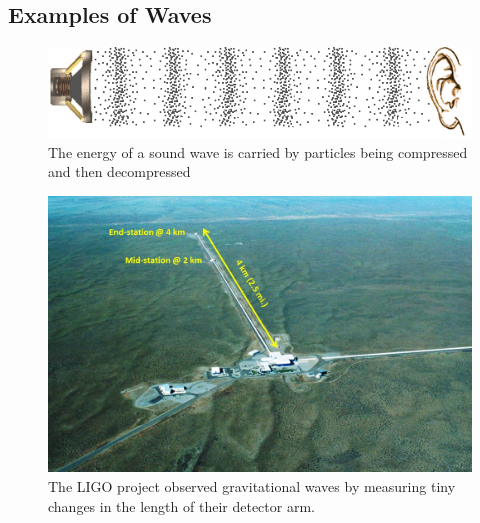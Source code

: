 \documentclass[a4paper]{amsbook}
\newcommand\capcite[1]{}
\begin{document}
\subsection{Examples of Waves}
\begin{figure}
  \centering
  \includegraphics[width=\textwidth]{soundwave}
  \caption{The energy of a sound wave is carried by particles being compressed and then decompressed \capcite{http://www.mediacollege.com/audio/images/loudspeaker-waveform.gif}\label{fig:compwave}}
\end{figure}
\begin{figure}
  \centering
  \includegraphics[width=\textwidth]{ligo}
  \caption{The LIGO project observed gravitational waves by measuring tiny changes in the length of their detector arm. \capcite{https://www.ligo.caltech.edu/system/media_files/binaries/271/original/Dual_detectors_with_arrow_and_stns_labeled.jpg?1453424757}\label{fig:ligo}}
\end{figure}
\end{document}
